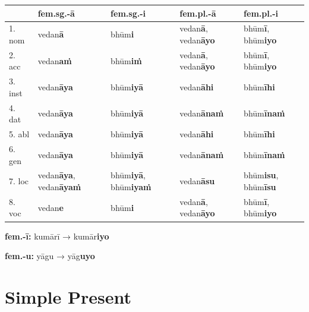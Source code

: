\documentclass[a4paper]{memoir}
\begin{document}
\begin{center}
\begin{tabular}{lllll}
 & \textbf{fem.sg.-ā} & \textbf{fem.sg.-i} & \textbf{fem.pl.-ā} & \textbf{fem.pl.-i}\\[0pt]
\hline
1. nom & vedan\textbf{ā} & bhūm\textbf{i} & vedan\textbf{ā}, vedan\textbf{āyo} & bhūm\textbf{ī}, bhūm\textbf{iyo}\\[0pt]
2. acc & vedan\textbf{aṁ} & bhūm\textbf{iṁ} & vedan\textbf{ā}, vedan\textbf{āyo} & bhūm\textbf{ī}, bhūm\textbf{iyo}\\[0pt]
3. inst & vedan\textbf{āya} & bhūm\textbf{iyā} & vedan\textbf{āhi} & bhūm\textbf{īhi}\\[0pt]
4. dat & vedan\textbf{āya} & bhūm\textbf{iyā} & vedan\textbf{ānaṁ} & bhūm\textbf{īnaṁ}\\[0pt]
5. abl & vedan\textbf{āya} & bhūm\textbf{iyā} & vedan\textbf{āhi} & bhūm\textbf{īhi}\\[0pt]
6. gen & vedan\textbf{āya} & bhūm\textbf{iyā} & vedan\textbf{ānaṁ} & bhūm\textbf{īnaṁ}\\[0pt]
7. loc & vedan\textbf{āya}, vedan\textbf{āyaṁ} & bhūm\textbf{iyā}, bhūm\textbf{iyaṁ} & vedan\textbf{āsu} & bhūm\textbf{isu}, bhūm\textbf{īsu}\\[0pt]
8. voc & vedan\textbf{e} & bhūm\textbf{i} & vedan\textbf{ā}, vedan\textbf{āyo} & bhūm\textbf{ī}, bhūm\textbf{iyo}\\[0pt]
\end{tabular}
\end{center}

\textbf{fem.-ī:} kumārī → kumār\textbf{iyo}

\textbf{fem.-u:} yāgu → yāg\textbf{uyo}

\clearpage

\section{Simple Present}
\label{sec:org49ae9d4}
\end{document}
